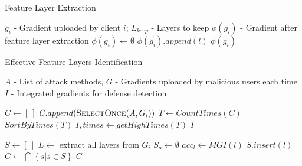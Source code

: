 \documentclass[conference]{IEEEtran}
\begin{document}
\begin{algorithm}
    \caption{Feature Layer Extraction}
    \label{alg:layerExtra}
    \begin{algorithmic}[1]
        \Require $g_i$ - Gradient uploaded by client $i$; $L_{keep}$ - Layers to keep
        \Ensure $\phi(g_i)$ - Gradient after feature layer extraction
            \State $\phi(g_i) \gets \emptyset$
                    \State $\phi(g_i).append(l)$
                \EndIf
            \EndFor
            \State \Return $\phi(g_i)$
        \EndFunction
    \end{algorithmic}
\end{algorithm}

\begin{algorithm}
    \caption{Effective Feature Layers Identification}
    \label{alg:featureLayerSelection}
    \begin{algorithmic}[1]
        \Require $A$ - List of attack methods, $G$ - Gradients uploaded by malicious users each time
        \Ensure $I$ - Integrated gradients for defense detection

            \State $C \gets \left [ \ \right ] $
                \State $C.append( \Call{SelectOnce}{A, G_i})$
            \EndFor
            \State $T \gets CountTimes(C)$
            \State $SortByTimes(T)$
            \State $I, times \gets getHighTimes(T)$
            \State \Return $I$
        \EndFunction

            \State $S \gets \left [ \ \right ] $
                \State $L \gets$ extract all layers from $G_i$
                \State $S_a \gets \emptyset$
                    \State $acc_l \gets MGI(l)$
                        \State $S.insert(l)$
                    \EndIf
                \EndFor
            \State $C \gets \bigcap\left \{ s | s\in S  \right \}$
            \EndFor
            \State \Return $C$
        \EndFunction


        


    \end{algorithmic}
\end{algorithm}
\end{document}
